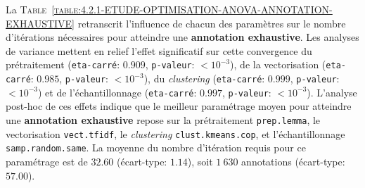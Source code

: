 			La \textsc{Table~\ref{table:4.2.1-ETUDE-OPTIMISATION-ANOVA-ANNOTATION-EXHAUSTIVE}} retranscrit l'influence de chacun des paramètres sur le nombre d'itérations nécessaires pour atteindre une \textbf{annotation exhaustive}.
			Les analyses de variance mettent en relief l'effet significatif sur cette convergence du prétraitement (\texttt{eta-carré}: $0.909$, \texttt{p-valeur}: $< 10^{-3}$), de la vectorisation (\texttt{eta-carré}: $0.985$, \texttt{p-valeur}: $< 10^{-3}$), du \textit{clustering} (\texttt{eta-carré}: $0.999$, \texttt{p-valeur}: $< 10^{-3}$) et de l'échantillonnage (\texttt{eta-carré}: $0.997$, \texttt{p-valeur}: $< 10^{-3}$).
			L'analyse post-hoc de ces effets indique que le meilleur paramétrage moyen pour atteindre une \textbf{annotation exhaustive} repose sur la prétraitement \texttt{prep.lemma}, le vectorisation \texttt{vect.tfidf}, le \textit{clustering} \texttt{clust.kmeans.cop}, et l'échantillonnage \texttt{samp.random.same}. La moyenne du nombre d'itération requis pour ce paramétrage est de $32.60$ (écart-type: $1.14$), soit $1~630$ annotations (écart-type: $57.00$).
